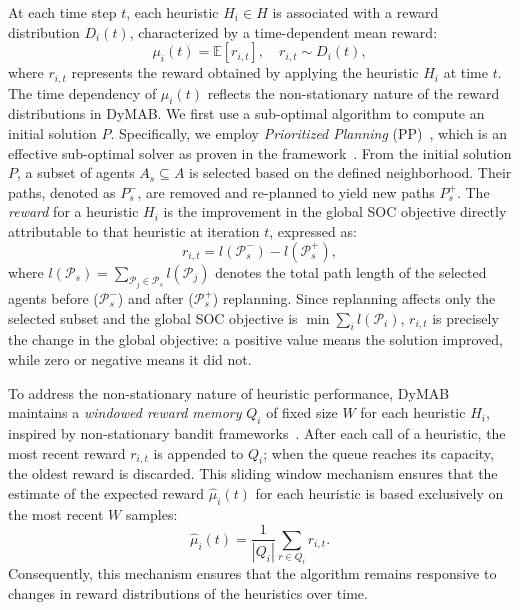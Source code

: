 \documentclass[review]{jair}
\begin{document}
At each time step $ t $, each heuristic $ H_i \in H $ is associated with a reward distribution $ D_i(t) $, characterized by a time-dependent mean reward:
\begin{equation}
\mu_i(t) = \mathbb{E}[r_{i,t}], \quad r_{i,t} \sim D_i(t),
\end{equation}
where $ r_{i,t} $ represents the reward obtained by applying the heuristic $ H_i $ at time $ t $. The time dependency of $ \mu_i(t) $ reflects the non-stationary nature of the reward distributions in DyMAB. 
We first use a sub-optimal algorithm to compute an initial solution $P$. Specifically, we employ \emph{Prioritized Planning} (PP)~\citep{PP}, which is an effective sub-optimal solver as proven in the  framework~\citep{LNS}. From the initial solution $ P $, a subset of agents $ A_s \subseteq A $ is selected based on the defined neighborhood. Their paths, denoted as $ P_s^- $, are removed and re-planned to yield new paths $ P_s^+ $. The \emph{reward} for a heuristic \( H_i \) is the improvement in the global SOC objective directly attributable to that heuristic at iteration $t$, expressed as:
\begin{equation}
r_{i,t} = l(\mathcal{P}_s^-) - l(\mathcal{P}_s^+),
\end{equation}
where \( l(\mathcal{P}_s) = \sum_{\mathcal{P}_j \in \mathcal{P}_s} l(\mathcal{P}_j) \) denotes the total path length of the selected agents before ($\mathcal{P}_s^-$) and after ($\mathcal{P}_s^+$) replanning. Since replanning affects only the selected subset and the global SOC objective is $\min \sum_i l(\mathcal{P}_i)$, $r_{i,t}$ is precisely the change in the global objective: a positive value means the solution improved, while zero or negative means it did not.

To address the non-stationary nature of heuristic performance, DyMAB maintains a \emph{windowed reward memory} \( Q_i \) of fixed size \( W \) for each heuristic \( H_i \), inspired by non-stationary bandit frameworks~\citep{Non-Stationary, Non-Stationary1, Non-Stationary2}. After each call of a heuristic, the most recent reward \( r_{i,t} \) is appended to \( Q_i \); when the queue reaches its capacity, the oldest reward is discarded. This sliding window mechanism ensures that the estimate of the expected reward \(\hat{\mu}_i(t)\) for each heuristic is based exclusively on the most recent \( W \) samples:
\begin{equation}
\hat{\mu}_i(t) = \frac{1}{|Q_i|} \sum_{r \in Q_i} r_{i,t}.
\end{equation}
Consequently, this mechanism ensures that the algorithm remains responsive to changes in reward distributions of the heuristics over time.
\end{document}
